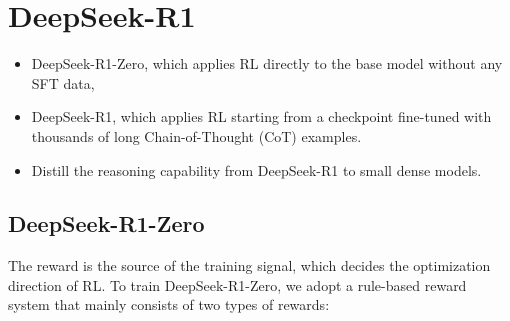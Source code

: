 
\section{DeepSeek-R1}

\begin{itemize}
	\item DeepSeek-R1-Zero, which applies RL directly to the base model without any SFT data, 
	\item DeepSeek-R1, which applies RL starting from a checkpoint fine-tuned with thousands of long Chain-of-Thought (CoT) examples. 
	\item Distill the reasoning capability from DeepSeek-R1 to small dense models.
\end{itemize}

\subsection{DeepSeek-R1-Zero}
The reward is the source of the training signal, which decides the optimization direction of RL. To train DeepSeek-R1-Zero, we adopt a rule-based reward system that mainly consists of two types of rewards:

